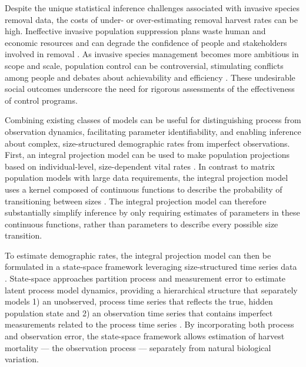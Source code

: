 \documentclass{article}
\begin{document}
Despite the unique statistical inference challenges associated with invasive species removal data, the costs of under- or over-estimating removal harvest rates can be high. Ineffective invasive population suppression plans waste human and economic resources and can degrade the confidence of people and stakeholders involved in removal \parencite{tiberti2021alien}. As invasive species management becomes more ambitious in scope and scale, population control can be controversial, stimulating conflicts among people and debates about achievability and efficiency \parencite{crowley2017conflict}. These undesirable social outcomes underscore the need for rigorous assessments of the effectiveness of control programs.

Combining existing classes of models can be useful for distinguishing process from observation dynamics, facilitating parameter identifiability, and enabling inference about complex, size-structured demographic rates from imperfect observations. First, an integral projection model can be used to make population projections based on individual-level, size-dependent vital rates \parencite{merow2014advancing, rees2014building}. In contrast to matrix population models with large data requirements, the integral projection model uses a kernel composed of continuous functions to describe the probability of transitioning between sizes \parencite{ellner2006integral}. The integral projection model can therefore substantially simplify inference by only requiring estimates of parameters in these continuous functions, rather than parameters to describe every possible size transition. 

To estimate demographic rates, the integral projection model can then be formulated in a state-space framework leveraging size-structured time series data \parencite{white2016fitting}. State-space approaches partition process and measurement error to estimate latent process model dynamics, providing a hierarchical structure that separately models 1) an unobserved, process time series that reflects the true, hidden population state and 2) an observation time series that contains imperfect measurements related to the process time series \parencite{auger2021guide, newman2006hidden}. By incorporating both process and observation error, the state-space framework allows estimation of harvest mortality — the observation process — separately from natural biological variation.
\end{document}
